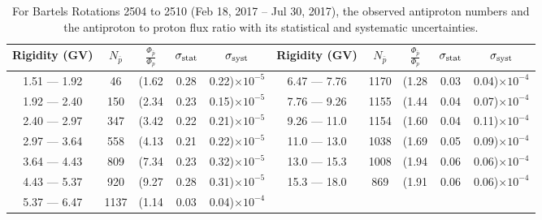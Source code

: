 \begin{table}[p] 
\renewcommand\baselinestretch{1.3}\selectfont
\setlength\tabcolsep{3pt}
\centering
\begin{tabular}{ccccc | ccccc}
\hline
\textbf{Rigidity}  (GV)  & $N_{\bar{p}}$ & $\frac{\Phi_{\bar{p}}}{\Phi_{p}}$ & $\sigma_{\rm{stat}}$ & $\sigma_{\rm{syst}}$ \hspace{1cm}   & \textbf{Rigidity}  (GV)  & $N_{\bar{p}}$ & $\frac{\Phi_{\bar{p}}}{\Phi_{p}}$ & $\sigma_{\rm{stat}}$ & $\sigma_{\rm{syst}}$ \hspace{1cm} \\ 
\hline
1.51 — 1.92   &  46                  &(1.62                          &  0.28              &      0.22)$\times 10^{-5}$  & 6.47 — 7.76                &  1170                    &(1.28                                &  0.03                   &      0.04)$\times 10^{-4}$\\
1.92 — 2.40   &  150                &(2.34                          &  0.23              &      0.15)$\times 10^{-5}$  & 7.76 — 9.26                &  1155                    &(1.44                                &  0.04                   &      0.07)$\times 10^{-4}$\\
2.40 — 2.97   &  347                &(3.42                          &  0.22              &      0.21)$\times 10^{-5}$  & 9.26 — 11.0                &  1154                    &(1.60                                &  0.04                   &      0.11)$\times 10^{-4}$\\    
2.97 — 3.64   &  558                &(4.13                          &  0.21              &      0.22)$\times 10^{-5}$  & 11.0 — 13.0                 &  1038                    &(1.69                                &  0.05                   &      0.09)$\times 10^{-4}$\\    
3.64 — 4.43   &  809                &(7.34                          &  0.23              &      0.32)$\times 10^{-5}$  & 13.0 — 15.3               &  1008                    &(1.94                                &  0.06                   &      0.06)$\times 10^{-4}$\\
4.43 — 5.37   &  920                &(9.27                          &  0.28              &      0.31)$\times 10^{-5}$  & 15.3 — 18.0               &  869                      &(1.91                                &  0.06                   &      0.06)$\times 10^{-4}$\\
5.37 — 6.47   &  1137              &(1.14                          &  0.03              &      0.04)$\times 10^{-4}$  & \\
\hline
\end{tabular}
\caption[Antiproton to proton flux ratio for Bartels Rotations 2504 to 2510]{For Bartels Rotations 2504 to 2510 (Feb 18, 2017 – Jul 30, 2017), the observed antiproton numbers and the antiproton to proton flux ratio with its statistical and systematic uncertainties.}
\label{TableOfDependent14}
\end{table}

